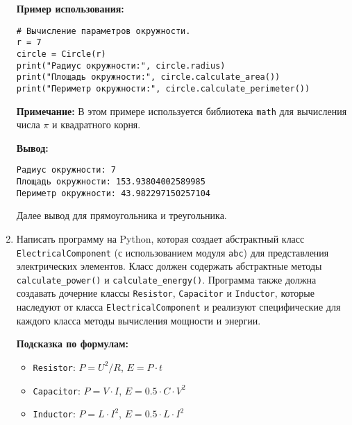 \begin{enumerate}
\textbf{Пример использования:}
\begin{verbatim}
# Вычисление параметров окружности.
r = 7
circle = Circle(r)
print("Радиус окружности:", circle.radius)
print("Площадь окружности:", circle.calculate_area())
print("Периметр окружности:", circle.calculate_perimeter())
\end{verbatim}

\textbf{Примечание:} В этом примере используется библиотека \texttt{math} для вычисления числа $\pi$ и квадратного корня.

\textbf{Вывод:}
\begin{verbatim}
Радиус окружности: 7
Площадь окружности: 153.93804002589985
Периметр окружности: 43.982297150257104
\end{verbatim}

Далее вывод для прямоугольника и треугольника.

\item
Написать программу на Python, которая создает абстрактный класс \texttt{ElectricalComponent} (с использованием модуля \texttt{abc}) для представления электрических элементов. 
Класс должен содержать абстрактные методы \texttt{calculate\_power()} и \texttt{calculate\_energy()}. 
Программа также должна создавать дочерние классы \texttt{Resistor}, \texttt{Capacitor} и \texttt{Inductor}, 
которые наследуют от класса \texttt{ElectricalComponent} и реализуют специфические для каждого класса методы вычисления мощности и энергии.

\textbf{Подсказка по формулам:}
\begin{itemize}
    \item \texttt{Resistor}: $P = U^2 / R$, $E = P \cdot t$
    \item \texttt{Capacitor}: $P = V \cdot I$, $E = 0.5 \cdot C \cdot V^2$
    \item \texttt{Inductor}: $P = L \cdot I^2$, $E = 0.5 \cdot L \cdot I^2$
\end{itemize}


\end{enumerate}
